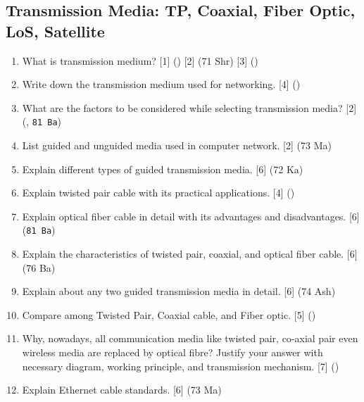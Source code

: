 \documentclass[12pt]{article}
\begin{document}
	\subsection{Transmission Media: TP, Coaxial, Fiber Optic, LoS, Satellite}
		\begin{enumerate}[noitemsep, topsep=0pt]
    		\item What is transmission medium? \hfill [1] () [2] (71 Shr) [3] ()
    
    		\item Write down the transmission medium used for networking. \hfill [4] ()
    
    		\item What are the factors to be considered while selecting transmission media? \hfill [2] (, \texttt{81 Ba})
    
    		\item List guided and unguided media used in computer network. \hfill [2] (73 Ma)

			\item Explain different types of guided transmission media. \hfill [6] (72 Ka)
    
    		\item Explain twisted pair cable with its practical applications. \hfill [4] ()
    
    		\item Explain optical fiber cable in detail with its advantages and disadvantages. \hfill [6] (\texttt{81 Ba})
    
    		\item Explain the characteristics of twisted pair, coaxial, and optical fiber cable. \hfill [6] (76 Ba)
    
    		\item Explain about any two guided transmission media in detail. \hfill [6] (74 Ash)
    
    		\item Compare among Twisted Pair, Coaxial cable, and Fiber optic. \hfill [5] ()
    
    		\item Why, nowadays, all communication media like twisted pair, co-axial pair even wireless media are replaced by optical fibre? Justify your answer with necessary diagram, working principle, and transmission mechanism. \hfill [7] ()
    
    		\item Explain Ethernet cable standards. \hfill [6] (73 Ma)
    

\end{enumerate}
\end{document}
